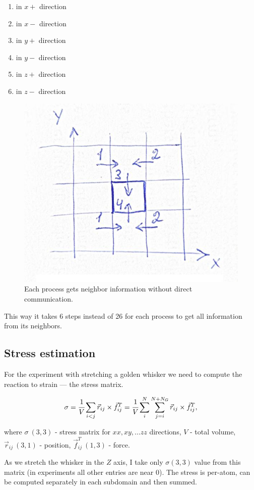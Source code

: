 \documentclass[12pt,a4paper]{article}
\newcommand{\mat}[1]{\vec{#1}}
\begin{document}
\begin{enumerate}
	\item in $x+$ direction
	\item in $x-$ direction
	\item in $y+$ direction
	\item in $y-$ direction
	\item in $z+$ direction
	\item in $z-$ direction
\end{enumerate}

\begin{figure}[h!]
	\centering
	\includegraphics[width=.5\linewidth]{img/milestone08-domain-communication.jpg}
	\caption{Each process gets neighbor information without direct communication.}
	\label{fig:domain-communication}
\end{figure}

This way it takes 6 steps instead of 26 for each process to get all information from its neighbors.

\subsection*{Stress estimation}

For the experiment with stretching a golden whisker we need to compute the reaction to strain --- the stress matrix.

\[
\sigma = \cfrac{1}{V} \sum_{i<j} \mat{r}_{ij} \times \mat{f}^T_{ij} = \cfrac{1}{V} \sum_i^{N} \sum_{j=i}^{N+N_G} \mat{r}_{ij} \times \mat{f}^T_{ij},
\]

where $\sigma\ (3, 3)$ - stress matrix for $xx, xy, \ldots zz$ directions, $V$ - total volume, $\mat{r}_{ij}\ (3, 1)$ - position, $\mat{f}^T_{ij}\ (1, 3)$ - force.

As we stretch the whisker in the $Z$ axis, I take only $\sigma(3, 3)$ value from this matrix (in experiments all other entries are near 0). The stress is per-atom, can be computed separately in each subdomain and then summed.
\end{document}
